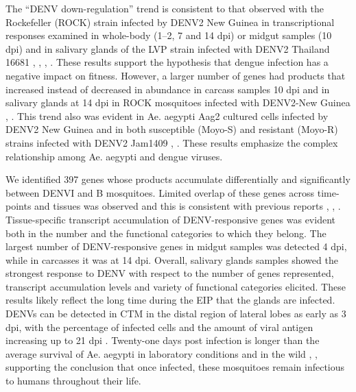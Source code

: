 The “DENV down-regulation” trend is consistent to that observed with the Rockefeller (ROCK) strain infected by DENV2 New Guinea in transcriptional responses examined in whole-body (1–2, 7 and 14 dpi) or midgut samples (10 dpi) and in salivary glands of the LVP strain infected with DENV2 Thailand 16681 \cite{Xi2008}, \cite{Luplertlop2011}, \cite{Sim2012}, \cite{Colpitts2011}.
These results support the hypothesis that dengue infection has a negative impact on fitness.
However, a larger number of genes had products that increased instead of decreased in abundance in carcass samples 10 dpi and in salivary glands at 14 dpi in ROCK mosquitoes infected with DENV2-New Guinea \cite{Xi2008}, \cite{Sim2012}.
This trend also was evident in Ae. aegypti Aag2 cultured cells infected by DENV2 New Guinea and in both susceptible (Moyo-S) and resistant (Moyo-R) strains infected with DENV2 Jam1409 \cite{Sim2010}, \cite{Behura2011}.
These results emphasize the complex relationship among Ae. aegypti and dengue viruses.

We identified 397 genes whose products accumulate differentially and significantly between DENVI and B mosquitoes.
Limited overlap of these genes across time-points and tissues was observed and this is consistent with previous reports \cite{Xi2008}, \cite{Sim2012}, \cite{Colpitts2011}.
Tissue-specific transcript accumulation of DENV-responsive genes was evident both in the number and the functional categories to which they belong.
The largest number of DENV-responsive genes in midgut samples was detected 4 dpi, while in carcasses it was at 14 dpi.
Overall, salivary glands samples showed the strongest response to DENV with respect to the number of genes represented, transcript accumulation levels and variety of functional categories elicited.
These results likely reflect the long time during the EIP that the glands are infected.
DENVs can be detected in CTM in the distal region of lateral lobes as early as 3 dpi, with the percentage of infected cells and the amount of viral antigen increasing up to 21 dpi \cite{Salazar2007}.
Twenty-one days post infection is longer than the average survival of Ae. aegypti in laboratory conditions and in the wild \cite{Muir1998}, \cite{Trpis1986}, supporting the conclusion that once infected, these mosquitoes remain infectious to humans throughout their life.

